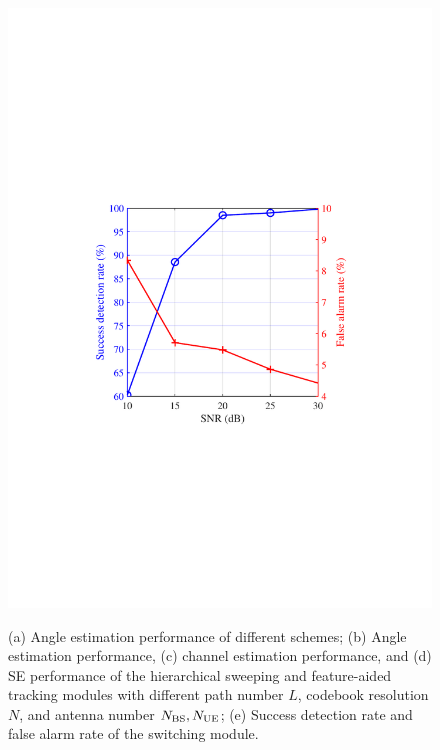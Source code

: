 \documentclass[journal,12pt,onecolumn,draftclsnofoot,]{IEEEtran}
\begin{document}
\begin{figure}
{\hspace{-0mm}\includegraphics[scale=0.46]{11.pdf}\hspace{-0mm}
}
\caption{(a) Angle estimation performance of different schemes; (b) Angle estimation performance, (c) channel estimation performance, and (d) SE performance of the hierarchical sweeping and feature-aided tracking modules with different path number $L$, codebook resolution $N$, and antenna number $N_{\rm BS},N_{\rm UE}$; (e) Success detection rate and false alarm rate of the switching module. }
\label{f}
\vspace{-10mm}
\end{figure}
\end{document}
